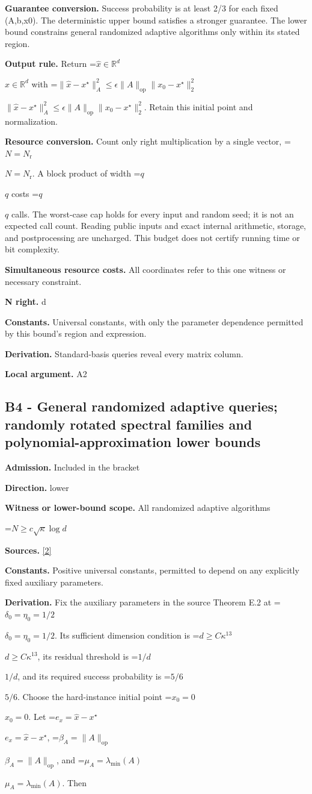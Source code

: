 \documentclass[10pt,a4paper]{article}
\newcommand{\AtlasMath}[1]{\par\begingroup\centering\setbox0=\hbox{$\displaystyle #1$}\ifdim\wd0>1.4\linewidth\typeout{ATLAS WIDE FORMULA: \the\wd0}\fi\ifdim\wd0>\linewidth\resizebox{\linewidth}{!}{\box0}\else\box0\fi\par\endgroup}
\newcommand{\AtlasInlineMath}[1]{\begingroup\setbox0=\hbox{$#1$}\ifdim\wd0>.4\linewidth\endgroup\AtlasMath{#1}\else\endgroup$#1$\fi}
\begin{document}
\textbf{Guarantee conversion.} Success probability is at least 2/3 for each fixed (A,b,x0). The deterministic upper bound satisfies a stronger guarantee. The lower bound constrains general randomized adaptive algorithms only within its stated region.

\textbf{Output rule.} Return \AtlasInlineMath{\widehat x\in\mathbb R^d} with \AtlasInlineMath{\|\widehat x-x^\star\|_A^2\le\epsilon\|A\|_{\mathrm{op}}\|x_0-x^\star\|_2^2}. Retain this initial point and normalization.

\textbf{Resource conversion.} Count only right multiplication by a single vector, \AtlasInlineMath{N=N_{\mathrm r}}. A block product of width \AtlasInlineMath{q} costs \AtlasInlineMath{q} calls. The worst-case cap holds for every input and random seed; it is not an expected call count. Reading public inputs and exact internal arithmetic, storage, and postprocessing are uncharged. This budget does not certify running time or bit complexity.

\textbf{Simultaneous resource costs.} All coordinates refer to this one witness or necessary constraint.

\textbf{N right.} d

\textbf{Constants.} Universal constants, with only the parameter dependence permitted by this bound’s region and expression.

\textbf{Derivation.} Standard-basis queries reveal every matrix column.

\textbf{Local argument.} A2

\subsection{B4 - General randomized adaptive queries; randomly rotated spectral families and polynomial-approximation lower bounds}
\textbf{Admission.} Included in the bracket

\textbf{Direction.} lower

\textbf{Witness or lower-bound scope.} All randomized adaptive algorithms

\AtlasMath{N\ge c\sqrt\kappa\log d}
\textbf{Sources.} \href{https://proceedings.mlr.press/v336/derezinski26a.html}{[2]}

\textbf{Constants.} Positive universal constants, permitted to depend on any explicitly fixed auxiliary parameters.

\textbf{Derivation.} Fix the auxiliary parameters in the source Theorem E.2 at \AtlasInlineMath{\delta_0=\eta_0=1/2}. Its sufficient dimension condition is \AtlasInlineMath{d\ge C\kappa^{13}}, its residual threshold is \AtlasInlineMath{1/d}, and its required success probability is \AtlasInlineMath{5/6}. Choose the hard-instance initial point \AtlasInlineMath{x_0=0}. Let \AtlasInlineMath{e_x=\widehat x-x^\star}, \AtlasInlineMath{\beta_A=\|A\|_{\mathrm{op}}}, and \AtlasInlineMath{\mu_A=\lambda_{\min}(A)}. Then
\end{document}
